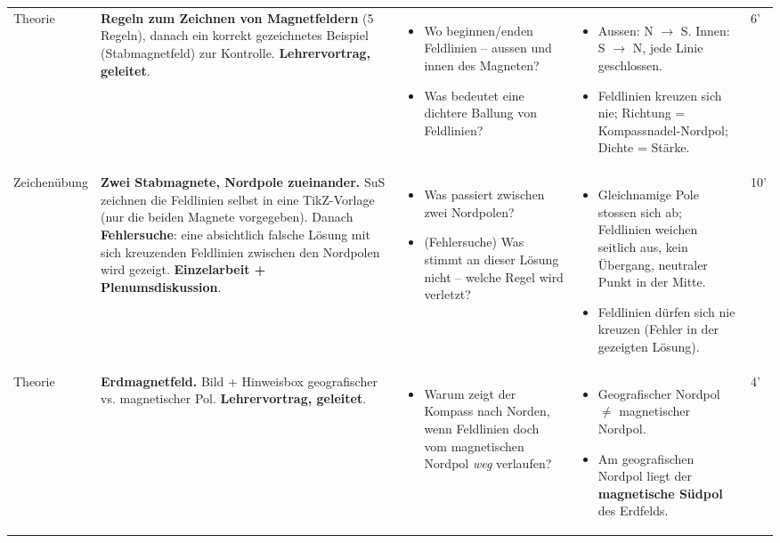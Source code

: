 \documentclass[11pt,a4paper]{article}
\newcommand{\Methode}[1]{{\small\color{groupteal}\textbf{#1}}}
\begin{document}
\begin{xltabular}{\textwidth}{@{}Y{2.1cm} Y{6.6cm} Y{6.6cm} Y{6.6cm} p{1.1cm}@{}}
Theorie &
\textbf{Regeln zum Zeichnen von Magnetfeldern} (5 Regeln), danach ein
korrekt gezeichnetes Beispiel (Stabmagnetfeld) zur Kontrolle.
\Methode{Lehrervortrag, geleitet}. &
\begin{itemize}
  \item Wo beginnen/enden Feldlinien -- aussen und innen des Magneten?
  \item Was bedeutet eine dichtere Ballung von Feldlinien?
\end{itemize} &
\begin{itemize}
  \item Aussen: N $\to$ S. Innen: S $\to$ N, jede Linie geschlossen.
  \item Feldlinien kreuzen sich nie; Richtung = Kompassnadel-Nordpol;
  Dichte = Stärke.
\end{itemize} &
6' \\[0.6em]

Zeichenübung &
\textbf{Zwei Stabmagnete, Nordpole zueinander.} SuS zeichnen die Feldlinien
selbst in eine TikZ-Vorlage (nur die beiden Magnete vorgegeben). Danach
\textbf{Fehlersuche}: eine absichtlich falsche Lösung mit sich
kreuzenden Feldlinien zwischen den Nordpolen wird gezeigt.
\Methode{Einzelarbeit + Plenumsdiskussion}. &
\begin{itemize}
  \item Was passiert zwischen zwei Nordpolen?
  \item (Fehlersuche) Was stimmt an dieser Lösung nicht -- welche Regel
  wird verletzt?
\end{itemize} &
\begin{itemize}
  \item Gleichnamige Pole stossen sich ab; Feldlinien weichen seitlich
  aus, kein Übergang, neutraler Punkt in der Mitte.
  \item Feldlinien dürfen sich nie kreuzen (Fehler in der gezeigten
  Lösung).
\end{itemize} &
10' \\[0.6em]

Theorie &
\textbf{Erdmagnetfeld.} Bild + Hinweisbox geografischer vs. magnetischer
Pol. \Methode{Lehrervortrag, geleitet}. &
\begin{itemize}
  \item Warum zeigt der Kompass nach Norden, wenn Feldlinien doch vom
  magnetischen Nordpol \emph{weg} verlaufen?
\end{itemize} &
\begin{itemize}
  \item Geografischer Nordpol $\neq$ magnetischer Nordpol.
  \item Am geografischen Nordpol liegt der \textbf{magnetische Südpol}
  des Erdfelds.
\end{itemize} &
4' \\[0.6em]


\end{xltabular}
\end{document}
